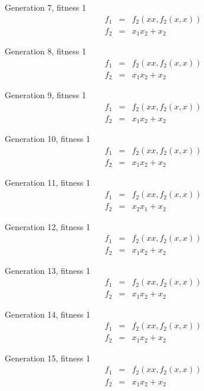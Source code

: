 Generation 7, fitness 1
\begin{eqnarray}
f_1 & = & f_2(x x,f_2(x,x))\nonumber \\
f_2 & = & x_1 x_2+x_2\nonumber 
\end{eqnarray}

Generation 8, fitness 1
\begin{eqnarray}
f_1 & = & f_2(x x,f_2(x,x))\nonumber \\
f_2 & = & x_1 x_2+x_2\nonumber 
\end{eqnarray}

Generation 9, fitness 1
\begin{eqnarray}
f_1 & = & f_2(x x,f_2(x,x))\nonumber \\
f_2 & = & x_1 x_2+x_2\nonumber 
\end{eqnarray}

Generation 10, fitness 1
\begin{eqnarray}
f_1 & = & f_2(x x,f_2(x,x))\nonumber \\
f_2 & = & x_1 x_2+x_2\nonumber 
\end{eqnarray}

Generation 11, fitness 1
\begin{eqnarray}
f_1 & = & f_2(x x,f_2(x,x))\nonumber \\
f_2 & = & x_2 x_1+x_2\nonumber 
\end{eqnarray}

Generation 12, fitness 1
\begin{eqnarray}
f_1 & = & f_2(x x,f_2(x,x))\nonumber \\
f_2 & = & x_1 x_2+x_2\nonumber 
\end{eqnarray}

Generation 13, fitness 1
\begin{eqnarray}
f_1 & = & f_2(x x,f_2(x,x))\nonumber \\
f_2 & = & x_1 x_2+x_2\nonumber 
\end{eqnarray}

Generation 14, fitness 1
\begin{eqnarray}
f_1 & = & f_2(x x,f_2(x,x))\nonumber \\
f_2 & = & x_1 x_2+x_2\nonumber 
\end{eqnarray}

Generation 15, fitness 1
\begin{eqnarray}
f_1 & = & f_2(x x,f_2(x,x))\nonumber \\
f_2 & = & x_1 x_2+x_2\nonumber 
\end{eqnarray}

